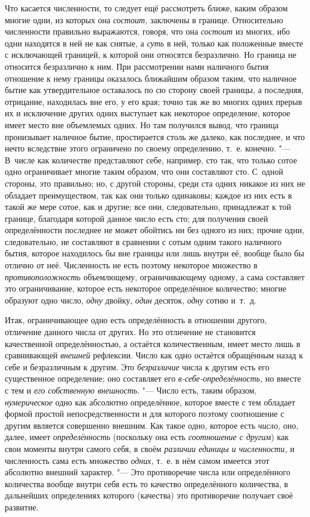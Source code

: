 Что касается численности, то следует ещё рассмотреть ближе, каким образом
многие одни, из которых она {\em состоит,} заключены в границе. Относительно
численности правильно выражаются, говоря, что она {\em состоит} из многих, ибо
одни находятся в ней не как снятые, а {\em суть} в ней, только как положенные
вместе с исключающей границей, к которой они относятся безразлично. Но граница
не относится безразлично к ним. При рассмотрении нами наличного бытия отношение
к нему границы оказалось ближайшим образом таким, что наличное бытие как
утвердительное оставалось по сю сторону своей границы, а последняя, отрицание,
находилась вне его, у его края; точно так же во многих одних прерыв их и
исключение других одних выступает как некоторое определение, которое имеет
место вне объемлемых одних. Но там получился вывод, что граница пронизывает
наличное бытие, простирается столь же далеко, как последнее, и что нечто
вследствие этого ограничено по своему определению, т.~е. конечно. "---
В~числе как количестве представляют себе, например, сто так,
что только сотое одно ограничивает многие таким образом, что они составляют
сто. С~одной стороны, это правильно; но, с другой стороны, среди ста одних
никакое из них не обладает преимуществом, так как они только одинаковы; каждое
из них есть в такой же мере сотое, как и другие; все они, следовательно,
принадлежат к той границе, благодаря которой данное число есть сто; для
получения своей определённости последнее не может обойтись ни без одного из
них; прочие одни, следовательно, не составляют в сравнении с сотым одним такого
наличного бытия, которое находилось бы вне границы или лишь внутри её, вообще
было бы отлично от неё. Численность не есть поэтому некоторое множество в {\em
противоположность} объемлющему, ограничивающему одному, а сама составляет это
ограничивание, которое есть некоторое определённое количество; многие образуют
одно число, {\em одну} двойку, {\em один} десяток, {\em одну} сотню и~т.~д.

Итак, ограничивающее одно есть определённость в отношении другого, отличение
данного числа от других. Но это отличение не становится качественной
определённостью, а остаётся количественным, имеет место лишь в сравнивающей
{\em внешней} рефлексии. Число как одно остаётся обращённым назад к себе и
безразличным к другим. Это {\em безразличие} числа к другим есть его
существенное определение; оно составляет его {\em в-себе-определённость,} но
вместе с тем и {\em его собственную внешность}. "--- Число есть, таким образом,
{\em нумерическое} одно как абсолютно определённое, которое вместе с тем
обладает формой простой непосредственности и для которого поэтому соотношение с
другим является совершенно внешним. Как такое одно, которое есть {\em число,}
оно, далее, имеет {\em определённость} (поскольку она есть {\em соотношение с
другим}) как свои моменты внутри самого себя, в своём {\em различии единицы и
численности,} и численность сама есть множество {\em одних,} т.~е. в нём самом
имеется этот абсолютно внешний характер. "--- Это противоречие числа или
определённого количества вообще внутри себя есть то качество определённого
количества, в дальнейших определениях которого (качества) это противоречие
получает своё развитие.

